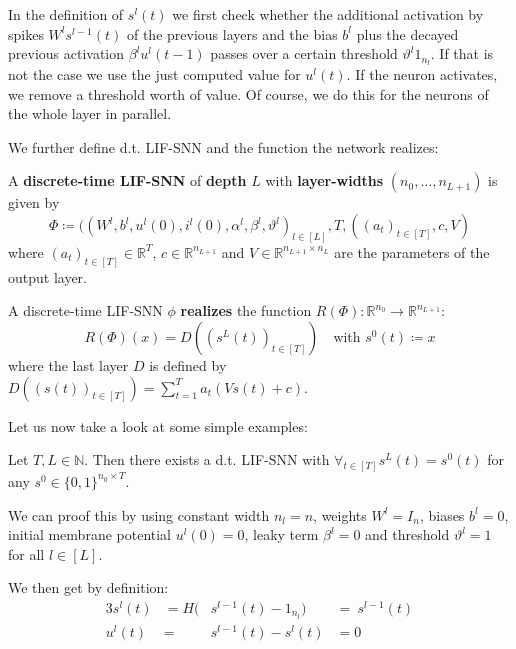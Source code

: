 In the definition of \(s^l(t)\) we first check whether the additional activation by spikes \(W^ls^{l-1}(t)\) of the previous layers and the bias \(b^l\) plus the decayed previous activation \(β^lu^l(t-1)\) passes over a certain threshold \(ϑ^l1_{n_l}\). If that is not the case we use the just computed value for \(u^l(t)\). If the neuron activates, we remove a threshold worth of value. Of course, we do this for the neurons of the whole layer in parallel.

We further define d.t. LIF-SNN and the function the network realizes:

\begin{definition}
  A \textbf{discrete-time LIF-SNN} of \textbf{depth} \(L\) with \textbf{layer-widths} \((n_0,…,n_{L+1})\) is given by
  \[ Φ≔((W^l,b^l,u^l(0),i^l(0),α^l,β^l,ϑ^l)_{l∈[L]},T,((a_t)_{t∈[T]},c,V) \]
  where \((a_t)_{t∈[T]}∈ℝ^T\), \(c∈ℝ^{n_{L+1}}\) and \(V∈ℝ^{n_{L+1}×n_L}\) are the parameters of the output layer.
\end{definition}

\begin{definition}
  A discrete-time LIF-SNN \(ϕ\) \textbf{realizes} the function \(R(Φ):ℝ^{n_0}→ℝ^{n_{L+1}}\):
  \[ R(Φ)(x)=D((s^L(t))_{t∈[T]})\quad \text{with }s^0(t)≔x\]
  where the last layer \(D\) is defined by \( D((s(t))_{t∈[T]})=\sum^T_{t=1}a_t(Vs(t)+c)\).
\end{definition}

Let us now take a look at some simple examples:

\begin{example}
  Let \(T,L∈ℕ\). Then there exists a d.t. LIF-SNN with \(∀_{t∈[T]}s^L(t)=s^0(t)\) for any \(s^0∈\{0,1\}^{n_0×T}\).

  We can proof this by using constant width \(n_l=n\), weights \(W^l=I_n\), biases \(b^l=0\), initial membrane potential \(u^l(0)=0\), leaky term \(β^l=0\) and threshold \(ϑ^l=1\) for all \(l∈[L]\).

  We then get by definition:
  \begin{alignat*}{3}
    s^l(t) & = H(& s^{l-1}(t)-1_{n_l})  &= \ s^{l-1}(t) \\
    u^l(t) & = & s^{l-1}(t)-s^l(t)     &= 0
  \end{alignat*}
\end{example}

